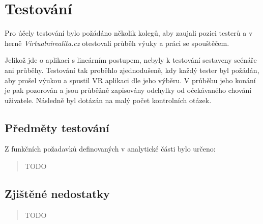 \section{Testování}\label{testovuxe1nuxed}

Pro účely testování bylo požádáno několik kolegů, aby zaujali pozici
testerů a v herně \emph{Virtualnirealita.cz} otestovali průběh výuky a
práci se spouštěčem.

Jelikož jde o aplikaci s lineárním postupem, nebyly k testování
sestaveny scénáře ani průběhy. Testování tak proběhlo zjednodušeně, kdy
každý tester byl požádán, aby prošel výukou a spustil VR aplikaci dle
jeho výběru. V průběhu jeho konání je pak pozorován a jsou průběžně
zapisovány odchylky od očekávaného chování uživatele. Následně byl
dotázán na malý počet kontrolních otázek.

\subsection{Předměty testování}\label{pux159edmux11bty-testovuxe1nuxed}

Z funkčních požadavků definovaných v analytické části bylo určeno:

\begin{quote}
TODO
\end{quote}

\subsection{Zjištěné nedostatky}\label{zjiux161tux11bnuxe9-nedostatky}

\begin{quote}
TODO
\end{quote}
